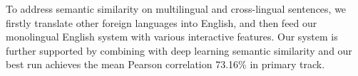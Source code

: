 To address semantic similarity on multilingual and cross-lingual sentences, we firstly translate other foreign languages into English, and then feed our monolingual English system with various interactive features. Our system is further supported by combining with deep learning semantic similarity and our best run achieves the mean Pearson correlation 73.16\% in primary track.
